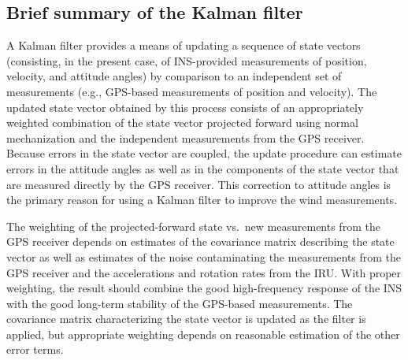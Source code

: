 \documentclass[12pt,twoside,english,12pt,twoside,english]{article}\usepackage[]{graphicx}\usepackage[]{color}
\let\OrgIndex\index
\renewcommand*{\index}[1]{\OrgIndex{#1}}
\begin{document}
\subsection{Brief summary of the Kalman filter}

A Kalman
filter provides a means of updating a sequence of state
vectors (consisting, in the present case, of INS-provided measurements
of position, velocity, and attitude angles)
by comparison to an independent set
of measurements (e.g., GPS-based measurements
of position and velocity). The updated state
vector obtained by this process consists of an appropriately weighted
combination of the state vector projected forward using normal mechanization
and the independent measurements from the GPS receiver. Because errors
in the state vector
are coupled, the update procedure can estimate
errors in the attitude angles
as well as in the components of the state vector
that are measured directly by the GPS receiver. This correction
to attitude angles is the primary
reason for using a Kalman filter to improve the wind measurements.

The weighting of the projected-forward state vs.~new measurements
from the GPS receiver depends on estimates
of the covariance matrix
describing the state vector as well as estimates
of the noise contaminating the measurements from the
GPS receiver and the accelerations and rotation rates from the IRU\@.
With proper weighting, the result should combine the good high-frequency
response of the INS with the good
long-term stability of the GPS-based measurements. The covariance
matrix characterizing the state vector is updated as the filter
is applied, but appropriate weighting depends on reasonable estimation
of the other error terms.
\end{document}
